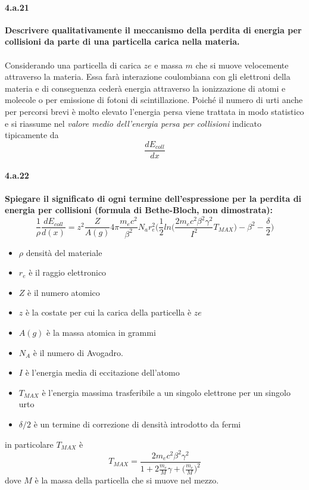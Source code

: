\documentclass[twoside]{article}
\begin{document}
\paragraph{4.a.21}\textbf{Descrivere qualitativamente il meccanismo della perdita di energia per collisioni da parte di una particella carica nella materia.}\\ \\
Considerando una particella di carica $ze$ e massa $m$ che si muove velocemente attraverso la materia. Essa farà interazione coulombiana con gli elettroni della materia e di conseguenza cederà energia attraverso la ionizzazione di atomi e molecole o per emissione di fotoni di scintillazione. Poiché il numero di urti anche per percorsi brevi è molto elevato l'energia persa viene trattata in modo statistico e si riassume nel \textit{valore medio dell'energia persa per collisioni} indicato tipicamente da
\begin{equation}
    \frac{dE_{coll}}{dx}
\end{equation}
\paragraph{4.a.22}\textbf{Spiegare il significato di ogni termine dell’espressione per la perdita di energia per collisioni (formula di Bethe-Bloch, non dimostrata):}
\begin{equation*}
    \frac{1}{\rho}\frac{dE_{coll}}{d(x)}=z^2\frac{Z}{A(g)}4\pi\frac{m_ec^2}{\beta^2}N_ar_e^2\biggl(\frac{1}{2}ln\biggl(\frac{2m_ec^2\beta^2\gamma^2}{I^2}T_{MAX}\biggr)-\beta^2-\frac{\delta}{2}\biggr)
\end{equation*}
\begin{itemize}
    \item $\rho$ densità del materiale
    \item $r_e$ è il raggio elettronico
    \item $Z$ è il numero atomico
    \item $z$ è la costate per cui la carica della particella è $ze$
    \item $A(g)$ è la massa atomica in grammi
    \item $N_A$ è il numero di Avogadro.
    \item $I$ è l'energia media di eccitazione dell'atomo
    \item $T_{MAX}$ è l'energia massima trasferibile a un singolo elettrone per un singolo urto
    \item $\delta/2$ è un termine di correzione di densità introdotto da fermi
\end{itemize}
in particolare $T_{MAX}$ è
\begin{equation}
    T_{MAX}=\frac{2m_ec^2\beta^2\gamma^2}{1+2\frac{m_e}{M}\gamma+\biggl(\frac{m_e}{M}\biggr)^2}
\end{equation}
dove $M$ è la massa della particella che si muove nel mezzo.
\end{document}
